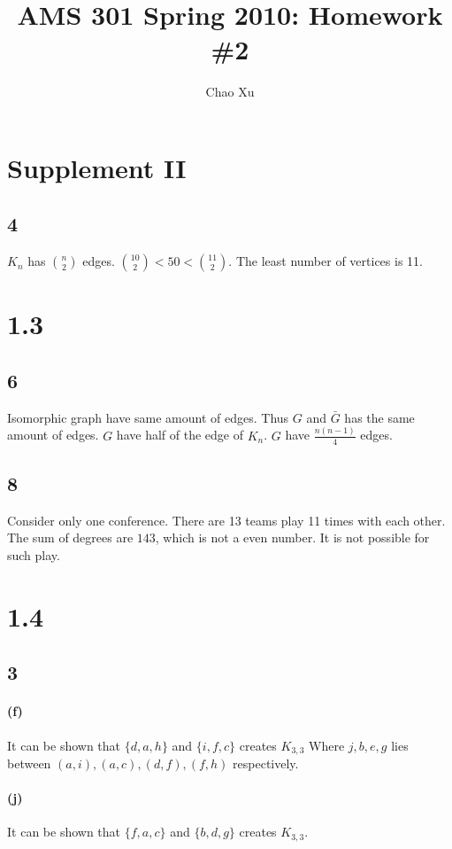 \documentclass{article}
\author{Chao Xu}
\title{AMS 301 Spring 2010: Homework \#2}
\date{}
\begin{document}
\maketitle
\vspace{-.5in}
\section*{Supplement II}
\subsection*{4}
$K_n$ has ${n \choose 2}$ edges. ${10 \choose 2}<50<{11 \choose 2}$. The least
number of vertices is 11.

\section*{1.3}
\subsection*{6}
Isomorphic graph have same amount of edges. Thus $G$ and $\bar G$ has the same
amount of edges. $G$ have half of the edge of $K_n$. $G$ have
$\frac{n(n-1)}{4}$ edges.

\subsection*{8}
Consider only one conference. There are 13 teams play 11 times with each other.
The sum of degrees are $143$, which is not a even number. It is not possible
for such play.

\section*{1.4}
\subsection*{3}
\paragraph*{(f)}
It can be shown that $\{d,a,h\}$ and $\{i,f,c\}$ creates $K_{3,3}$ Where
$j,b,e,g$ lies between $(a,i),(a,c),(d,f),(f,h)$ respectively.

\paragraph*{(j)}
It can be shown that $\{f,a,c\}$ and $\{b,d,g\}$ creates $K_{3,3}$.
\end{document}
